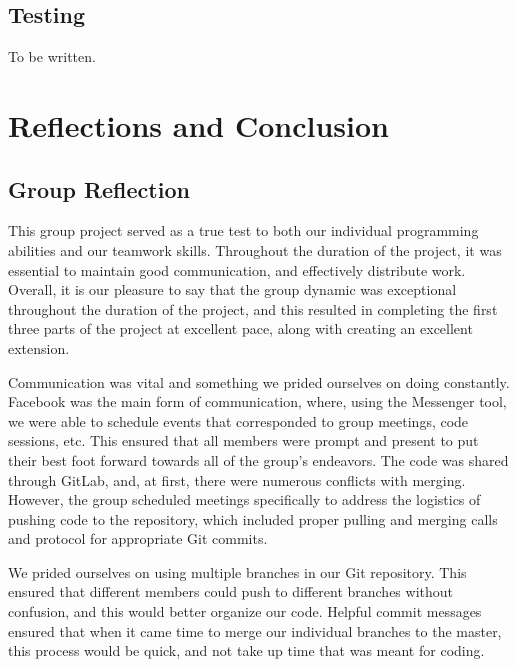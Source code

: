 \documentclass[11pt]{article}
\begin{document}
\subsection{Testing}

To be written.

\section{Reflections and Conclusion}

\subsection{Group Reflection}

This group project served as a true test to both our individual programming abilities and our teamwork skills. Throughout the duration of the project, it was essential to maintain good communication, and effectively distribute work. Overall, it is our pleasure to say that the group dynamic was exceptional throughout the duration of the project, and this resulted in completing the first three parts of the project at excellent pace, along with creating an excellent extension.

\vspace{0.2in}

Communication was vital and something we prided ourselves on doing constantly. Facebook was the main form of communication, where, using the Messenger tool, we were able to schedule events that corresponded to group meetings, code sessions, etc. This ensured that all members were prompt and present to put their best foot forward towards all of the group's endeavors. The code was shared through GitLab, and, at first, there were numerous conflicts with merging. However, the group scheduled meetings specifically to address the logistics of pushing code to the repository, which included proper pulling and merging calls and protocol for appropriate Git commits.

\vspace{0.2in}

We prided ourselves on using multiple branches in our Git repository. This ensured that different members could push to different branches without confusion, and this would better organize our code. Helpful commit messages ensured that when it came time to merge our individual branches to the master, this process would be quick, and not take up time that was meant for coding.

\vspace{0.2in}
\end{document}

